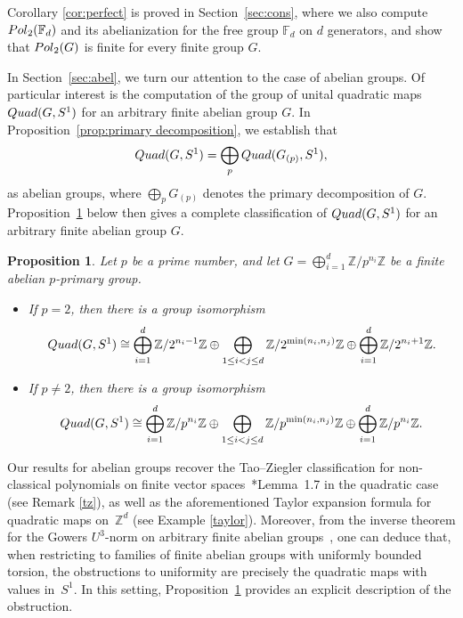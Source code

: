 \documentclass[a4paper,11pt]{amsproc}
\theoremstyle{plain}
\newtheorem{proposition}[theorem]{Proposition}
\theoremstyle{definition}
\begin{document}
Corollary \ref{cor:perfect} is proved in Section~\ref{sec:cons}, where we also compute ${\rm Pol}_2(\mathbb{F}_d)$ and its abelianization for the free group $\mathbb{F}_d$ on $d$ generators, and show that ${\rm Pol}_2(G)$ is finite for every finite group $G$.

In Section~\ref{sec:abel}, we turn our attention to the case of abelian groups. Of particular interest is the computation of the group of unital quadratic maps ${\rm Quad}(G, S^1)$ for an arbitrary finite abelian group $G$. In Proposition~\ref{prop:primary decomposition}, we establish that
\[
{\rm Quad}(G, S^1) = \bigoplus_p {\rm Quad}(G_{(p)}, S^1),
\]
as abelian groups, where $\bigoplus_p G_{(p)}$ denotes the primary decomposition of $G$. Proposition~\ref{classification} below then gives a complete classification of ${\rm Quad}(G, S^1)$ for an arbitrary finite abelian group $G$. 

\begin{proposition}\label{classification}
Let $p$ be a prime number, and let $G = \bigoplus_{i=1}^d \mathbb{Z}/p^{n_i}\mathbb{Z}$ be a finite abelian $p$-primary group. 
\begin{itemize}
\item[(i)] If $p = 2$, then there is a group isomorphism
\[
{\rm Quad}(G, S^1) \cong \bigoplus_{i=1}^d \mathbb{Z}/2^{n_i - 1}\mathbb{Z} \oplus \bigoplus_{1 \leq i < j \leq d} \mathbb{Z}/2^{\min(n_i, n_j)}\mathbb{Z} \oplus \bigoplus_{i=1}^d \mathbb{Z}/2^{n_i + 1}\mathbb{Z}.
\]
\item[(ii)] If $p \neq 2$, then there is a group isomorphism
\[
{\rm Quad}(G, S^1) \cong \bigoplus_{i=1}^d \mathbb{Z}/p^{n_i}\mathbb{Z} \oplus \bigoplus_{1 \leq i < j \leq d} \mathbb{Z}/p^{\min(n_i, n_j)}\mathbb{Z} \oplus \bigoplus_{i=1}^d \mathbb{Z}/p^{n_i}\mathbb{Z}.
\]
\end{itemize}
\end{proposition}

Our results for abelian groups recover the Tao--Ziegler classification for non-classical polynomials on finite vector spaces~\cite{tz2}*{Lemma~1.7} in the quadratic case (see Remark \ref{tz}), as well as the aforementioned Taylor expansion formula for quadratic maps on~$\mathbb{Z}^d$ (see Example \ref{taylor}). Moreover, from the inverse theorem for the Gowers $U^3$-norm on arbitrary finite abelian groups~\cite{jt}, one can deduce that, when restricting to families of finite abelian groups with uniformly bounded torsion, the obstructions to uniformity are precisely the quadratic maps with values in~$S^1$. In this setting, Proposition~\ref{classification} provides an explicit description of the obstruction.
\end{document}
